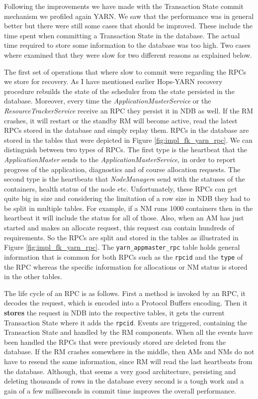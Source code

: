 Following the improvements we have made with the Transaction State
commit mechanism we profiled again YARN. We saw that the performance
was in general better but there were still some cases that should be
improved. These include the time spent when committing a Transaction
State in the database. The actual time required to store some
information to the database was too high. Two cases where examined that
they were slow for two different reasons as explained below.

The first set of operations that where slow to commit were regarding
the RPCs we store for recovery. As I have mentioned earlier Hops-YARN
recovery procedure rebuilds the state of the scheduler from the state
persisted in the database. Moreover, every time the
\emph{ApplicationMasterService} or the \emph{ResourceTrackerService}
receive an RPC they persist it in NDB as well. If the RM crashes, it
will restart or the standby RM will become active, read the latest
RPCs stored in the database and simply replay them. RPCs in the
database are stored in the tables that were depicted in Figure
\ref{fig:impl_fk_yarn_rpc}. We can distinguish between two types of
RPCs. The first type is the heartbeat that the
\emph{ApplicationMaster} sends to the \emph{ApplicationMasterService},
in order to report progress of the application, diagnostics and of
course allocation requests. The second type is the heartbeats that
\emph{NodeManager}s send with the statuses of the containers, health
status of the node etc. Unfortunately, these RPCs can get quite big
in size and considering the limitation of a row size in NDB they had
to be split in multiple tables. For example, if a NM runs 1000
containers then in the heartbeat it will include the status for all of
those. Also, when an AM has just started and makes an allocate
request, this request can contain hundreds of requirements. So the
RPCs are split and stored in the tables as illustrated in Figure
\ref{fig:impl_fk_yarn_rpc}. The \texttt{yarn\_appmaster\_rpc} table
holds general information that is common for both RPCs such as the
\texttt{rpcid} and the \texttt{type} of the RPC whereas the
specific information for allocations or NM status is stored in the
other tables.

The life cycle of an RPC is as follows. First a method is invoked by
an RPC, it decodes the request, which is encoded into a Protocol
Buffers encoding. Then it \textbf{stores} the request in NDB into the
respective tables, it gets the current Transaction State where it adds
the \texttt{rpcid}. Events are triggered, containing the
Transaction State and handled by the RM components. When all the
events have been handled the RPCs that were previously stored are deleted
from the database. If the RM crashes somewhere in the middle, then AMs
and NMs do not have to resend the same information, since RM will read
the last heartbeats from the database. Although, that seems a very
good architecture, persisting and deleting thousands of rows in the
database every second is a tough work and a gain of a few milliseconds
in commit time improves the overall performance.

